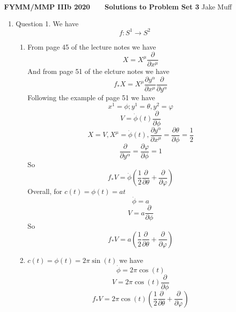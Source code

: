 \documentclass[12pt]{article}
\begin{document}
\normalsize

\baselineskip 14pt

\begin{center}
{\Large {\bf FYMM/MMP IIIb 2020 \ \ \  Solutions to Problem Set 3}}
Jake Muff
\end{center}



\begin{enumerate}
    \item Question 1. We have 
    $$ f: S^1 \rightarrow S^2 $$ 
    \begin{enumerate}
        \item From page 45 of the lecture notes we have 
        $$ X = X^{\mu} \frac{\partial}{\partial x^{\mu}} $$
        And from page 51 of the elcture notes we have 
        $$ f_* X = X^{\mu} \frac{\partial y^{\alpha}}{\partial x^{\mu}} \frac{\partial}{\partial y^{\alpha}} $$
        Following the example of page 51 we have 
        $$ x^1 = \phi; y^1 = \theta, y^2 = \varphi $$ 
        $$ V = \dot{\phi}(t) \frac{\partial}{\partial \phi} $$ 
        $$ X = V, X^{\mu} = \dot{\phi}(t), \frac{\partial y^{\alpha}}{\partial x^{\mu}} = \frac{\partial \theta}{\partial \phi} = \frac{1}{2} $$
        $$ \frac{\partial}{\partial y^{\alpha}} = \frac{\partial \varphi}{\partial \phi} = 1 $$
        So 
        $$ f_* V = \dot{\phi} ( \frac{1}{2} \frac{\partial}{\partial \theta} + \frac{\partial}{\partial \varphi} ) $$
        Overall, for $c(t) = \phi (t) = at$ 
        $$ \dot{\phi} = a $$
        $$ V = a \frac{\partial}{\partial \phi} $$
        So 
        $$ f_* V = a( \frac{1}{2} \frac{\partial}{\partial \theta} + \frac{\partial}{\partial \varphi} ) $$

        \item $c(t) = \phi (t) = 2 \pi \sin (t) $ we have 
        $$ \dot{\phi} = 2 \pi \cos(t)  $$
        $$ V = 2 \pi \cos (t) \frac{\partial}{\partial \phi} $$
        $$ f_* V = 2 \pi \cos (t) ( \frac{1}{2} \frac{\partial}{\partial \theta} + \frac{\partial}{\partial \varphi}) $$

    \end{enumerate}


\end{enumerate}
\end{document}
